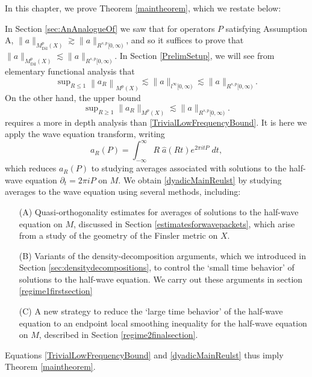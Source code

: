 
In this chapter, we prove Theorem \ref{maintheorem}, which we restate below:

\thmmaintheorem*

In Section \ref{sec:AnAnalogueOf} we saw that for operators $P$ satisfying Assumption A, $\| a \|_{M^p_{\text{Dil}}(X)} \gtrsim \| a \|_{R^{s,p}[0,\infty)}$, and so it suffices to prove that $\| a \|_{M^p_{\text{Dil}}(X)} \lesssim \| a \|_{R^{s,p}[0,\infty)}$. In Section \ref{PrelimSetup}, we will see from elementary functional analysis that
%
\begin{equation} \label{TrivialLowFrequencyBound}
    \sup\nolimits_{R \leq 1} \left\| a_R \right\|_{M^p(X)} \lesssim \| a \|_{l^\infty[0,\infty)} \lesssim \| a \|_{R^{s,p}[0,\infty)}.
\end{equation}
%
On the other hand, the upper bound
%
\begin{equation} \label{dyadicMainReulst}
    \sup\nolimits_{R \geq 1} \| a_R \|_{M^p(X)} \lesssim \| a \|_{R^{s,p}[0,\infty)}.
\end{equation}
%
requires a more in depth analysis than \eqref{TrivialLowFrequencyBound}. It is here we apply the wave equation transform, writing
%
\begin{equation}
    a_R(P) = \int_{-\infty}^\infty R\;\! \widehat{a}(Rt) e^{2 \pi i t P}\; dt,
\end{equation}
%
which reduces $a_R(P)$ to studying averages associated with solutions to the half-wave equation $\partial_t = 2 \pi i P$ on $M$. We obtain \eqref{dyadicMainReulst} by studying averages to the wave equation using several methods, including:
%
\begin{itemize}
    \item[(A)] Quasi-orthogonality estimates for averages of solutions to the half-wave equation on $M$, discussed in Section \ref{estimatesforwavepackets}, which arise from a study of the geometry of the Finsler metric on $X$.

    \item[(B)] Variants of the density-decomposition arguments, which we introduced in Section \ref{sec:densitydecompositions}, to control the `small time behavior' of solutions to the half-wave equation. We carry out these arguments in section \ref{regime1firstsection}

    \item[(C)] A new strategy to reduce the `large time behavior' of the half-wave equation to an endpoint local smoothing inequality for the half-wave equation on $M$, described in Section \ref{regime2finalsection}.
\end{itemize}
%
Equations \eqref{TrivialLowFrequencyBound} and \eqref{dyadicMainReulst} thus imply Theorem \ref{maintheorem}.

